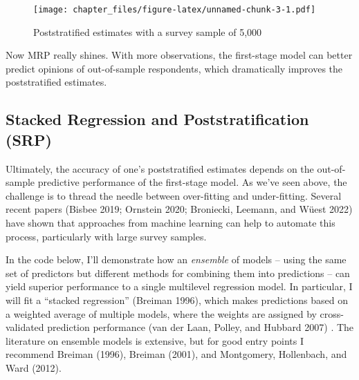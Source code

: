 \documentclass[
]{article}
\begin{document}
\begin{figure}
\centering
\texttt{[image: chapter\_files/figure-latex/unnamed-chunk-3-1.pdf]}
\caption{Poststratified estimates with a survey sample of 5,000}
\end{figure}

Now MRP really shines. With more observations, the first-stage model can
better predict opinions of out-of-sample respondents, which dramatically
improves the poststratified estimates.

\hypertarget{stacked-regression-and-poststratification-srp}{%
\subsection{Stacked Regression and Poststratification
(SRP)}\label{stacked-regression-and-poststratification-srp}}

Ultimately, the accuracy of one's poststratified estimates depends on
the out-of-sample predictive performance of the first-stage model. As
we've seen above, the challenge is to thread the needle between
over-fitting and under-fitting. Several recent papers (Bisbee 2019;
Ornstein 2020; Broniecki, Leemann, and Wüest 2022) have shown that
approaches from machine learning can help to automate this process,
particularly with large survey samples.

In the code below, I'll demonstrate how an \emph{ensemble} of models --
using the same set of predictors but different methods for combining
them into predictions -- can yield superior performance to a single
multilevel regression model. In particular, I will fit a ``stacked
regression'' (Breiman 1996), which makes predictions based on a weighted
average of multiple models, where the weights are assigned by
cross-validated prediction performance (van der Laan, Polley, and
Hubbard 2007) . The literature on ensemble models is extensive, but for
good entry points I recommend Breiman (1996), Breiman (2001), and
Montgomery, Hollenbach, and Ward (2012).
\end{document}
